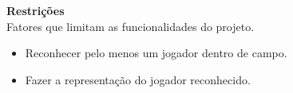 \textbf{Restrições} \\
Fatores que limitam as funcionalidades do projeto.
\begin{itemize}
\raggedright \item Reconhecer pelo menos um jogador dentro de campo.
\raggedright \item Fazer a representação do jogador reconhecido.
\end{itemize}